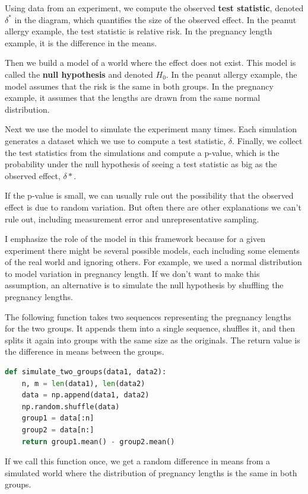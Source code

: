 Using data from an experiment, we compute the observed \textbf{test
statistic}, denoted \(\delta^*\) in the diagram, which quantifies the
size of the observed effect. In the peanut allergy example, the test
statistic is relative risk. In the pregnancy length example, it is the
difference in the means.

Then we build a model of a world where the effect does not exist. This
model is called the \textbf{null hypothesis} and denoted \(H_0\). In the
peanut allergy example, the model assumes that the risk is the same in
both groups. In the pregnancy example, it assumes that the lengths are
drawn from the same normal distribution.

Next we use the model to simulate the experiment many times. Each
simulation generates a dataset which we use to compute a test statistic,
\(\delta\). Finally, we collect the test statistics from the simulations
and compute a p-value, which is the probability under the null
hypothesis of seeing a test statistic as big as the observed effect,
\(\delta*\).

If the p-value is small, we can usually rule out the possibility that
the observed effect is due to random variation. But often there are
other explanations we can't rule out, including measurement error and
unrepresentative sampling.

I emphasize the role of the model in this framework because for a given
experiment there might be several possible models, each including some
elements of the real world and ignoring others. For example, we used a
normal distribution to model variation in pregnancy length. If we don't
want to make this assumption, an alternative is to simulate the null
hypothesis by shuffling the pregnancy lengths.

The following function takes two sequences representing the pregnancy
lengths for the two groups. It appends them into a single sequence,
shuffles it, and then splits it again into groups with the same size as
the originals. The return value is the difference in means between the
groups.

\begin{lstlisting}[language=Python,style=source]
def simulate_two_groups(data1, data2):
    n, m = len(data1), len(data2)
    data = np.append(data1, data2)
    np.random.shuffle(data)
    group1 = data[:n]
    group2 = data[n:]
    return group1.mean() - group2.mean()
\end{lstlisting}

If we call this function once, we get a random difference in means from
a simulated world where the distribution of pregnancy lengths is the
same in both groups.

